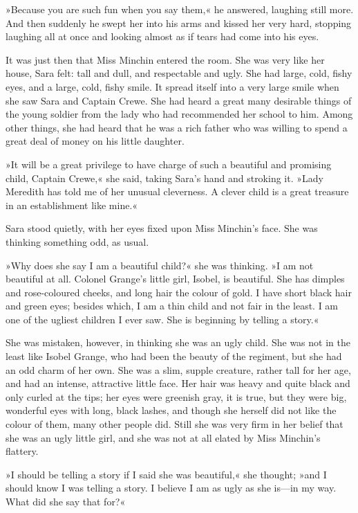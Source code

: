 »Because you are such fun when you say them,« he answered, laughing still more. And then suddenly he swept her into his arms and kissed her very hard, stopping laughing all at once and looking almost as if tears had come into his eyes.

It was just then that Miss Minchin entered the room. She was very like her house, Sara felt: tall and dull, and respectable and ugly. She had large, cold, fishy eyes, and a large, cold, fishy smile. It spread itself into a very large smile when she saw Sara and Captain Crewe. She had heard a great many desirable things of the young soldier from the lady who had recommended her school to him. Among other things, she had heard that he was a rich father who was willing to spend a great deal of money on his little daughter.

»It will be a great privilege to have charge of such a beautiful and promising child, Captain Crewe,« she said, taking Sara's hand and stroking it. »Lady Meredith has told me of her unusual cleverness. A clever child is a great treasure in an establishment like mine.«

Sara stood quietly, with her eyes fixed upon Miss Minchin's face. She was thinking something odd, as usual.

»Why does she say I am a beautiful child?« she was thinking. »I am not beautiful at all. Colonel Grange's little girl, Isobel, is beautiful. She has dimples and rose-coloured cheeks, and long hair the colour of gold. I have short black hair and green eyes; besides which, I am a thin child and not fair in the least. I am one of the ugliest children I ever saw. She is beginning by telling a story.«

She was mistaken, however, in thinking she was an ugly child. She was not in the least like Isobel Grange, who had been the beauty of the regiment, but she had an odd charm of her own. She was a slim, supple creature, rather tall for her age, and had an intense, attractive little face. Her hair was heavy and quite black and only curled at the tips; her eyes were greenish gray, it is true, but they were big, wonderful eyes with long, black lashes, and though she herself did not like the colour of them, many other people did. Still she was very firm in her belief that she was an ugly little girl, and she was not at all elated by Miss Minchin's flattery.

»I should be telling a story if I said she was beautiful,« she thought; »and I should know I was telling a story. I believe I am as ugly as she is—in my way. What did she say that for?«

